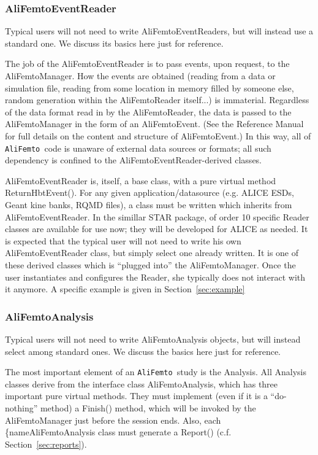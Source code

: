 \documentclass[twoside]{article}
\newcommand{\name}[1]{\textsf{#1}}%
\newcommand{\meth}[1]{\textsf{#1}}%
\newcommand{\AliFemto}{{\tt AliFemto }}
\begin{document}
\subsubsection{AliFemtoEventReader}
\label{sec:AliFemtoEventReader}

Typical users will not need to write \name{AliFemtoEventReader}s, but will instead use a standard one.  We discuss its basics here
just for reference.


The job of the \name{AliFemtoEventReader} is to pass events, upon request, to the \name{AliFemtoManager}.  
How the events are obtained (reading from
a data or simulation file, reading from some location in memory filled by someone else, random generation within the \name{AliFemtoReader} itself...) is
immaterial.  Regardless
of the data format read in by the \name{AliFemtoReader}, the data is passed to the \name{AliFemtoManager} in the form of an \name{AliFemtoEvent}.  
(See the Reference Manual for full details on the content and structure of \name{AliFemtoEvent}.)
In this way, all
of \AliFemto code is unaware of external data sources or formats; all such dependency is confined to the \name{AliFemtoEventReader}-derived classes.


\name{AliFemtoEventReader} is, itself, a base class, with a pure virtual method \meth{ReturnHbtEvent()}.  For any given application/datasource (e.g.
ALICE ESDs, Geant kine banks, RQMD files), a class must be written which inherits from AliFemtoEventReader.
In the simillar STAR package, of order 10 specific Reader classes
are available for use now; they will be developed for ALICE as needed. 
It is expected that the typical user will not need to write his own \name{AliFemtoEventReader} class, but simply select one already written.
It is one of these derived classes which is ``plugged into'' the \name{AliFemtoManager}.  Once the user instantiates and configures
the Reader, she typically does not interact with it anymore.  A specific example is given in Section~\ref{sec:example}



\subsubsection{AliFemtoAnalysis}
\label{sec:AliFemtoAnalysis}

Typical users will not need to write \name{AliFemtoAnalysis} objects, but will instead select among standard ones.  We discuss the basics here
just for reference.


The most important element of an \AliFemto study is the Analysis.  All Analysis classes derive from the interface class
\name{AliFemtoAnalysis}, which has three important pure virtual methods.  
They must implement (even if it is a ``do-nothing'' method) a \meth{Finish()} method, which will be invoked by
the \name{AliFemtoManager} just before the session ends.  Also, each \{name{AliFemtoAnalysis} class must generate 
a \meth{Report()} (c.f. Section~\ref{sec:reports}).
\end{document}
